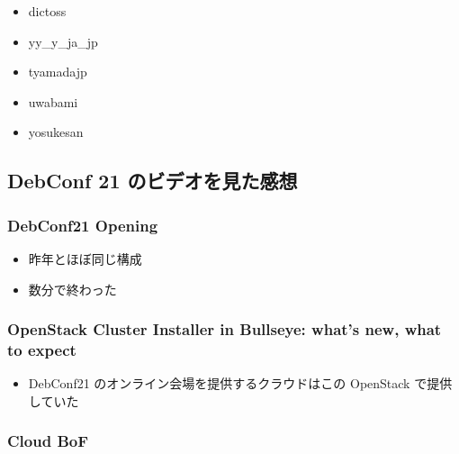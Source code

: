 \documentclass[mingoth,a4paper]{jsarticle}
\begin{document}
\begin{itemize}
\item dictoss
\item yy\_y\_ja\_jp
\item tyamadajp
\item uwabami
\item yosukesan
\end{itemize}

\subsection{DebConf 21 のビデオを見た感想}

\subsubsection{DebConf21 Opening}

\begin{itemize}
\item 昨年とほぼ同じ構成
\item 数分で終わった
\end{itemize}

\subsubsection{OpenStack Cluster Installer in Bullseye: what's new, what to expect}

\begin{itemize}
\item DebConf21 のオンライン会場を提供するクラウドはこの OpenStack で提供していた
\end{itemize}

\subsubsection{Cloud BoF}
\end{document}
